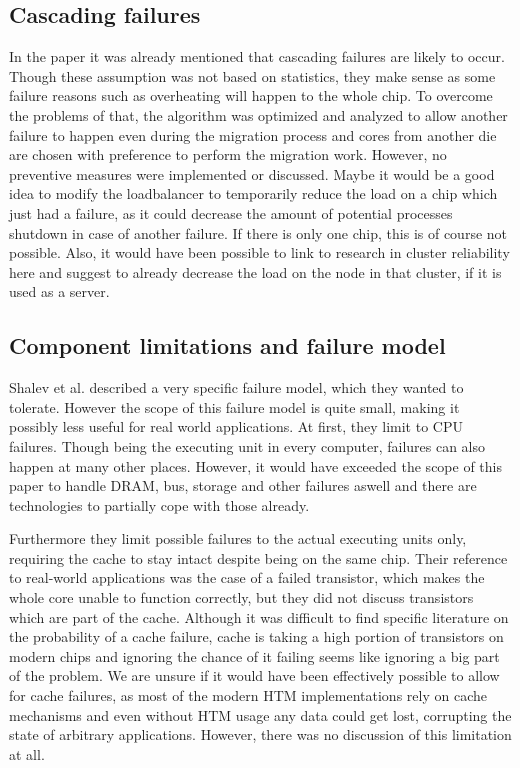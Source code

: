 \documentclass[a4paper,10pt,twoside]{article}
\begin{document}
\subsection{Cascading failures}
In the paper it was already mentioned that cascading failures are likely to occur. Though these assumption was not based on statistics, they make sense as some failure reasons such as overheating will happen to the whole chip. To overcome the problems of that, the algorithm was optimized and analyzed to allow another failure to happen even during the migration process and cores from another die are chosen with preference to perform the migration work. However, no preventive measures were implemented or discussed. Maybe it would be a good idea to modify the loadbalancer to temporarily reduce the load on a chip which just had a failure, as it could decrease the amount of potential processes shutdown in case of another failure. If there is only one chip, this is of course not possible. Also, it would have been possible to link to research in cluster reliability here and suggest to already decrease the load on the node in that cluster, if it is used as a server.

\subsection{Component limitations and failure model} \label{cachefailure}
Shalev et al. described a very specific failure model, which they wanted to tolerate. However the scope of this failure model is quite small, making it possibly less useful for real world applications. At first, they limit to CPU failures. Though being the executing unit in every computer, failures can also happen at many other places. However, it would have exceeded the scope of this paper to handle DRAM, bus, storage and other failures aswell and there are technologies to partially cope with those already.

Furthermore they limit possible failures to the actual executing units only, requiring the cache to stay intact despite being on the same chip. Their reference to real-world applications was the case of a failed transistor, which makes the whole core unable to function correctly, but they did not discuss transistors which are part of the cache. Although it was difficult to find specific literature on the probability of a cache failure, cache is taking a high portion of transistors on modern chips and ignoring the chance of it failing seems like ignoring a big part of the problem. We are unsure if it would have been effectively possible to allow for cache failures, as most of the modern HTM implementations rely on cache mechanisms and even without HTM usage any data could get lost, corrupting the state of arbitrary applications. However, there was no discussion of this limitation at all.
\end{document}

